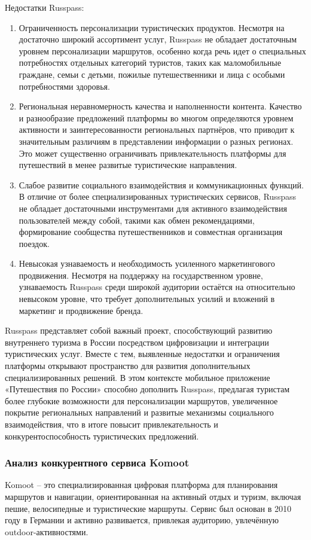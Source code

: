 \noindent Недостатки Russpass:
\begin{enumerate}
    \item Ограниченность персонализации туристических продуктов. Несмотря на достаточно широкий ассортимент услуг, Russpass не обладает достаточным уровнем персонализации маршрутов, особенно когда речь идет о специальных потребностях отдельных категорий туристов, таких как маломобильные граждане, семьи с детьми, пожилые путешественники и лица с особыми потребностями здоровья.
    \item Региональная неравномерность качества и наполненности контента. Качество и разнообразие предложений платформы во многом определяются уровнем активности и заинтересованности региональных партнёров, что приводит к значительным различиям в представлении информации о разных регионах. Это может существенно ограничивать привлекательность платформы для путешествий в менее развитые туристические направления.
    \item Слабое развитие социального взаимодействия и коммуникационных функций. В отличие от более специализированных туристических сервисов, Russpass не обладает достаточными инструментами для активного взаимодействия пользователей между собой, такими как обмен рекомендациями, формирование сообщества путешественников и совместная организация поездок.
    \item Невысокая узнаваемость и необходимость усиленного маркетингового продвижения. Несмотря на поддержку на государственном уровне, узнаваемость Russpass среди широкой аудитории остаётся на относительно невысоком уровне, что требует дополнительных усилий и вложений в маркетинг и продвижение бренда.
\end{enumerate}

\noindent Russpass представляет собой важный проект, способствующий развитию внутреннего туризма в России посредством цифровизации и интеграции туристических услуг. Вместе с тем, выявленные недостатки и ограничения платформы открывают пространство для развития дополнительных специализированных решений. В этом контексте мобильное приложение «Путешествия по России» способно дополнить Russpass, предлагая туристам более глубокие возможности для персонализации маршрутов, увеличенное покрытие региональных направлений и развитые механизмы социального взаимодействия, что в итоге повысит привлекательность и конкурентоспособность туристических предложений.

\subsubsection*{Анализ конкурентного сервиса Komoot}
Komoot – это специализированная цифровая платформа для планирования маршрутов и навигации, ориентированная на активный отдых и туризм, включая пешие, велосипедные и туристические маршруты. Сервис был основан в 2010 году в Германии и активно развивается, привлекая аудиторию, увлечённую outdoor-активностями.


